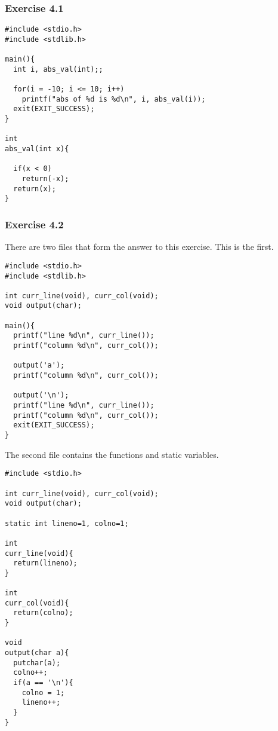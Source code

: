   

  \subsubsection*{Exercise 4.1}

   \begin{Verbatim}
#include <stdio.h>
#include <stdlib.h>

main(){
  int i, abs_val(int);;

  for(i = -10; i <= 10; i++)
    printf("abs of %d is %d\n", i, abs_val(i));
  exit(EXIT_SUCCESS);
}

int
abs_val(int x){

  if(x < 0)
    return(-x);
  return(x);
}
\end{Verbatim}

  

  \subsubsection*{Exercise 4.2}

   There are two files that form the answer to this exercise. This is the
    first.


   \begin{Verbatim}
#include <stdio.h>
#include <stdlib.h>

int curr_line(void), curr_col(void);
void output(char);

main(){
  printf("line %d\n", curr_line());
  printf("column %d\n", curr_col());

  output('a');
  printf("column %d\n", curr_col());

  output('\n');
  printf("line %d\n", curr_line());
  printf("column %d\n", curr_col());
  exit(EXIT_SUCCESS);
}
\end{Verbatim}

   The second file contains the functions and static variables.


   \begin{Verbatim}
#include <stdio.h>

int curr_line(void), curr_col(void);
void output(char);

static int lineno=1, colno=1;

int
curr_line(void){
  return(lineno);
}

int
curr_col(void){
  return(colno);
}

void
output(char a){
  putchar(a);
  colno++;
  if(a == '\n'){
    colno = 1;
    lineno++;
  }
}
\end{Verbatim}

